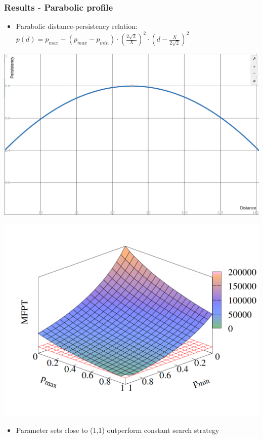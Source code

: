 \documentclass[11pt]{beamer}
\begin{document}
\begin{frame}
 \frametitle{Results - Parabolic profile}
 
 \begin{itemize}
  \item Parabolic distance-persistency relation:\newline
        $p\left(d\right)=p_{max}-\left(p_{max}-p_{min}\right)\cdot\left(\frac{2\sqrt{2}}{X}\right)^2\cdot \left(d-\frac{X}{2\sqrt{2}}\right)^2$
 \end{itemize}
 \begin{minipage}[h]{0.49\textwidth}
  \centering
  \includegraphics[width=1.0\textwidth]{gfx/parabolProfile.png}
 \end{minipage}
 \begin{minipage}[h]{0.49\textwidth}
  \centering
  \includegraphics[width=1.0\textwidth]{gfx/paraMFPT-3D.png}
 \end{minipage}
 \begin{itemize}
  \item Parameter sets close to (1,1) outperform constant search strategy
 \end{itemize}
\end{frame}
\end{document}
